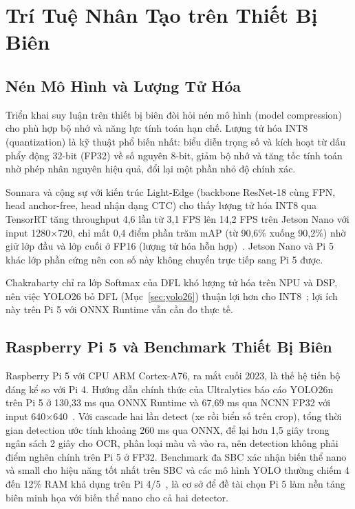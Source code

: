 \section{Trí Tuệ Nhân Tạo trên Thiết Bị Biên}

\subsection{Nén Mô Hình và Lượng Tử Hóa}

Triển khai suy luận trên thiết bị biên đòi hỏi nén mô hình (model compression) cho phù
hợp bộ nhớ và năng lực tính toán hạn chế. Lượng tử hóa INT8 (quantization) là kỹ thuật
phổ biến nhất: biểu diễn trọng số và kích hoạt từ dấu phẩy động 32-bit (FP32) về số
nguyên 8-bit, giảm bộ nhớ và tăng tốc tính toán nhờ phép nhân nguyên hiệu quả, đổi lại
một phần nhỏ độ chính xác.

Sonnara và cộng sự với kiến trúc Light-Edge (backbone ResNet-18 cùng FPN, head
anchor-free, head nhận dạng CTC) cho thấy lượng tử hóa INT8 qua TensorRT tăng
throughput 4,6 lần từ 3,1 FPS lên 14,2 FPS trên Jetson Nano với input 1280×720, chỉ mất
0,4 điểm phần trăm mAP (từ 90,6\% xuống 90,2\%) nhờ giữ lớp đầu và lớp cuối ở FP16 (lượng
tử hóa hỗn hợp)~\autocite{sonnara2025lightedge}. Jetson Nano và Pi 5 khác lớp phần cứng nên con số
này không chuyển trực tiếp sang Pi 5 được.

Chakrabarty chỉ ra lớp Softmax của DFL khó lượng tử hóa trên NPU và DSP, nên việc YOLO26
bỏ DFL (Mục~\ref{sec:yolo26}) thuận lợi hơn cho INT8~\autocite{chakrabarty2026yolo26nmsfree};
lợi ích này trên Pi 5 với ONNX Runtime vẫn cần đo thực tế.

\subsection{Raspberry Pi 5 và Benchmark Thiết Bị Biên}
\label{sec:pi5bench}

Raspberry Pi 5 với CPU ARM Cortex-A76, ra mắt cuối 2023, là thế hệ tiến bộ đáng kể so với
Pi 4. Hướng dẫn chính thức của Ultralytics báo cáo YOLO26n trên Pi 5 ở 130,33 ms qua ONNX
Runtime và 67,69 ms qua NCNN FP32 với input 640×640~\autocite{ultralytics2026rpiguide}.
Với cascade hai lần detect (xe rồi biển số trên crop), tổng thời gian detection ước tính
khoảng 260 ms qua ONNX, để lại hơn 1,5 giây trong ngân sách 2 giây cho OCR, phân loại màu
và vào ra, nên detection không phải điểm nghẽn chính trên Pi 5 ở FP32. Benchmark đa SBC
xác nhận biến thể nano và small cho hiệu năng tốt nhất trên SBC và các mô hình YOLO
thường chiếm 4 đến 12\% RAM khả dụng trên Pi 4/5~\autocite{mdpi2026sbcbenchmark}, là cơ sở
để đề tài chọn Pi 5 làm nền tảng biên minh họa với biến thể nano cho cả hai detector.

